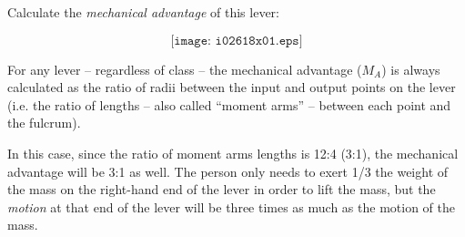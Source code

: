 

Calculate the {\it mechanical advantage} of this lever:

$$\texttt{[image: i02618x01.eps]}$$







For any lever -- regardless of class -- the mechanical advantage ($M_A$) is always calculated as the ratio of radii between the input and output points on the lever (i.e. the ratio of lengths -- also called ``moment arms'' -- between each point and the fulcrum).

In this case, since the ratio of moment arms lengths is 12:4 (3:1), the mechanical advantage will be 3:1 as well.  The person only needs to exert 1/3 the weight of the mass on the right-hand end of the lever in order to lift the mass, but the {\it motion} at that end of the lever will be three times as much as the motion of the mass.











